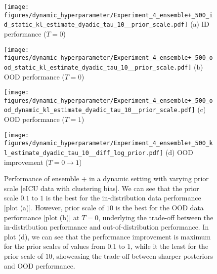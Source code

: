 \begin{figure}[h]
\centering
\begin{minipage}[b]{0.24\textwidth}
\centering
\texttt{[image: figures/dynamic\_hyperparameter/Experiment\_4\_ensemble+\_500\_id\_static\_kl\_estimate\_dyadic\_tau\_10\_\_prior\_scale.pdf]}
{\small{{(a)} ID performance ($T=0$) }}
\end{minipage}
\hfill
\begin{minipage}[b]{0.24\textwidth}
\centering \texttt{[image: figures/dynamic\_hyperparameter/Experiment\_4\_ensemble+\_500\_ood\_static\_kl\_estimate\_dyadic\_tau\_10\_\_prior\_scale.pdf]}
{\small{{(b)} OOD performance ($T=0$) }}
\end{minipage}
\hfill
\begin{minipage}[b]{0.24\textwidth}
\centering \texttt{[image: figures/dynamic\_hyperparameter/Experiment\_4\_ensemble+\_500\_ood\_dynamic\_kl\_estimate\_dyadic\_tau\_10\_\_prior\_scale.pdf]}
{\small{{(c)} OOD performance ($T= 1$) }}\end{minipage}
\hfill
\begin{minipage}[b]{0.24\textwidth}
\centering \texttt{[image: figures/dynamic\_hyperparameter/Experiment\_4\_ensemble+\_500\_kl\_estimate\_dyadic\_tau\_10\_\_diff\_log\_prior.pdf]}
{\small{{(d)} OOD improvement ($T=0 \to 1$) }}
\end{minipage}
\caption{Performance of ensemble $+$ in a dynamic setting with varying prior scale [eICU data with clustering bias]. We can see that the prior scale $0.1$ to $1$ is  the best for the in-distribution data performance [plot (a)]. 
However, prior scale of $10$ is the best for the OOD data performance [plot (b)] at $T=0$, underlying the trade-off between the in-distribution performance and out-of-distribution performance. In plot (d), we can see that the performance improvement is maximum for the prior scales  of values from $0.1$ to $1$, while it the least for the prior scale of $10$, showcasing the trade-off between sharper posteriors and OOD performance. 
}
\label{fig:Ensemble+_prior_scale}
\end{figure}




